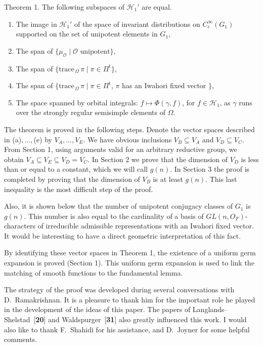 \documentclass{amsart}
\begin{document}
\bigskip
\proclaim Theorem 1.  
  The following subspaces of 
  $ {\mathcal H}_1' $ are equal.
\begin{enumerate}[label=(\alph*)]
\item 
  The image in 
    $ {\mathcal H}_1' $
  of the space of invariant distributions on
    $ C_c^{\infty}  (G_1) $
  supported on the set of unipotent elements in $G_1$,
\item 
  The span of 
    $ \{ \mu_{\mathcal O} \mid \mathcal O \text{ unipotent}\} $,
\item 
  The span of 
    $ \{ \text{trace}_{\,\Omega}\,\pi \mid
         \pi \in \Pi^{\text{t}} \} $,
\item 
  The span of
    $ \{ \text{trace}_{\,\Omega}\,\pi \mid
         \pi \in \Pi^{\text{t}} $, 
    $ \pi $
    has an Iwahori fixed vector $\}$,
\item 
  The space spanned by orbital integrals:
    $ f \mapsto \Phi (\gamma, f) $, for
    $ f \in {\mathcal H}_1 $,
  as $\gamma$ runs over the strongly regular semisimple
  elements of 
  $ \Omega $.
\end{enumerate}
\finishproclaim

\medskip
\noindent
The theorem is proved in the following steps.
Denote the vector spaces described in (a)$,\dots,$(e) by
  $ V_A,\ldots,V_E$.
We have obvious inclusions
  $ V_B \subseteq V_A$ and $V_D \subseteq V_C $.
From Section 1, using arguments valid for an arbitrary
  reductive group, we obtain
  $ V_A \subseteq V_E \subseteq V_D = V_C $.
In Section 2 we prove that the dimension of $V_D$ is less than or
equal to a constant, which we will call $g(n)$.
In Section 3 the proof is completed by proving that the dimension
of $V_B$ is at least $g(n)$.
This last inequality is the most difficult step of the proof.

Also, it is shown below that the number of unipotent conjugacy classes of
$G_1$ is 
    $ g(n) $.
    This number is also
  equal to the cardinality of a basis of $GL(n,O_F)$-characters
  of irreducible admissible representations with an Iwahori fixed vector.
It would be interesting to have a direct geometric interpretation of 
  this fact.

By identifying these vector spaces in Theorem 1, the existence of
  a uniform germ expansion is proved (Section 1).
This uniform germ expansion is used to link the matching of 
  smooth functions to the fundamental lemma.

The strategy of the proof was developed during several conversations
  with D.~Ramakrishnan.
It is a pleasure to thank him for the important role he played in
  the development of the ideas of this paper.
The papers of Langlands--Shelstad~[{\bf 20}] and Waldspurger~[{\bf 31}]
  also greatly influenced this work.
I would also like to thank F.~Shahidi for his assistance, and D.~Joyner 
  for some helpful comments.
\end{document}
